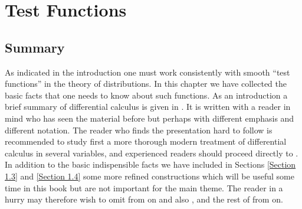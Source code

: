 \chapter{Test Functions}

\section*{Summary}
As indicated in the introduction one must work consistently with smooth ``test functions'' in the theory of distributions. In this chapter we have collected the basic facts that one needs to know about such functions. As an introduction a brief summary of differential calculus is given in . It is written with a reader in mind who has seen the material before but perhaps with different emphasis and different notation. The reader who finds the presentation hard to follow is recommended to study first a more thorough modern treatment of differential calculus in several variables, and experienced readers should proceed directly to . In addition to the basic indispensible facts we have included in Sections \ref{Section 1.3} and \ref{Section 1.4} some more refined constructions which will be useful some time in this book but are not important for the main theme. The reader in a hurry may therefore wish to omit  from  on and also ,  and the rest of  from  on.

